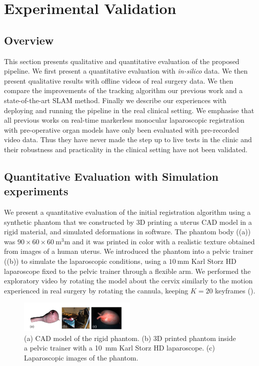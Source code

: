 
\section{Experimental Validation}
\label{sec:experiments}
\subsection{Overview}
This section presents qualitative and quantitative evaluation of the proposed pipeline. We first present a quantitative evaluation with \textit{in-silico} data. We then present qualitative results with offline videos of real surgery data. We then compare the improvements of the tracking algorithm \wrt our previous work and a state-of-the-art SLAM method. Finally we describe our experiences with deploying and running the pipeline in the real clinical setting. We emphasise that all previous works on real-time markerless monocular laparoscopic registration with pre-operative organ models have only been evaluated with pre-recorded video data. Thus they have never made the step up to live tests in the clinic and their robustness and practicality in the clinical setting have not been validated. 

\subsection{Quantitative Evaluation with Simulation experiments}
\label{sec:experiments_Simulation}
We present a quantitative evaluation of the initial registration algorithm using a synthetic phantom that we constructed by 3D printing a uterus CAD model in a rigid material, and simulated deformations in software.
The phantom body ((a)) was $90 \times 60 \times 60~\si{\cubic\milli\metre}$ and it was printed in color with a realistic texture obtained from images of a human uterus. We introduced the phantom into a pelvic trainer ((b)) to simulate the laparoscopic conditions, using a $\SI{10}{\milli\metre}$ Karl Storz HD laparoscope fixed to the pelvic trainer through a flexible arm. We performed the exploratory video by rotating the model about the cervix similarly to the motion experienced in real surgery by rotating the cannula, keeping $K=20$ keyframes ().
 
\begin{figure}[htb]
  \centering
  \includegraphics[width=0.5\textwidth]{./figs/phantom.pdf}
\caption{(a) CAD model of the rigid phantom. (b) 3D printed phantom inside a pelvic trainer with a \SI{10}{\milli\metre} Karl Storz HD laparoscope. (c) Laparoscopic images of the phantom.}
\label{fig:phantom}
\end{figure}


